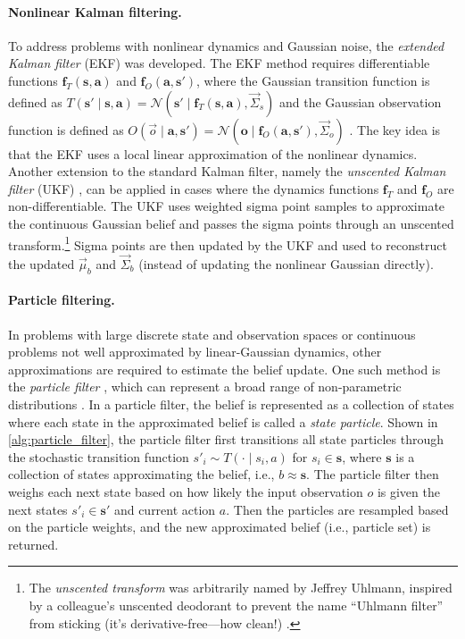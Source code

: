 

\paragraph{Nonlinear Kalman filtering.}
To address problems with nonlinear dynamics and Gaussian noise, the \textit{extended Kalman filter} (EKF) \cite{julier1997new} was developed. The EKF method requires differentiable functions $\mathbf{f}_T(\mathbf{s}, \mathbf{a})$ and $\mathbf{f}_O(\mathbf{a}, \mathbf{s}')$, where the Gaussian transition function is defined as $T(\mathbf{s}' \mid \mathbf{s}, \mathbf{a}) = \mathcal{N}(\mathbf{s}' \mid \mathbf{f}_T(\mathbf{s}, \mathbf{a}), \vec{\Sigma}_s)$ and the Gaussian observation function is defined as $O(\vec{o} \mid \mathbf{a}, \mathbf{s}') = \mathcal{N}(\mathbf{o} \mid \mathbf{f}_O(\mathbf{a}, \mathbf{s}'), \vec{\Sigma}_o)$ \cite{dmbook}.
The key idea is that the EKF uses a local linear approximation of the nonlinear dynamics.
Another extension to the standard Kalman filter, namely the \textit{unscented Kalman filter} (UKF) \cite{wan2000unscented}, can be applied in cases where the dynamics functions $\mathbf{f}_T$ and $\mathbf{f}_O$ are non-differentiable.
The UKF uses weighted sigma point samples to approximate the continuous Gaussian belief and passes the sigma points through an unscented transform.\footnote{The \textit{unscented transform} was arbitrarily named by Jeffrey Uhlmann, inspired by a colleague's unscented deodorant to prevent the name ``Uhlmann filter'' from sticking (it's derivative-free---how clean!) \cite{unscented2021uhlmann}.}
Sigma points are then updated by the UKF and used to reconstruct the updated $\vec{\mu}_b$ and $\vec{\Sigma}_b$ (instead of updating the nonlinear Gaussian directly).

\paragraph{Particle filtering.}
In problems with large discrete state and observation spaces or continuous problems not well approximated by linear-Gaussian dynamics, other approximations are required to estimate the belief update.
One such method is the \textit{particle filter} \cite{gordon1993novel}, which can represent a broad range of non-parametric distributions \cite{thrun2005probabilistic}.
In a particle filter, the belief is represented as a collection of states where each state in the approximated belief is called a \textit{state particle}.
Shown in \cref{alg:particle_filter}, the particle filter first transitions all state particles through the stochastic transition function $s'_i \sim T(\cdot \mid s_i, a)$ for $s_i \in \mathbf{s}$, where $\mathbf{s}$ is a collection of states approximating the belief, i.e., $b \approx \mathbf{s}$.
The particle filter then weighs each next state based on how likely the input observation $o$ is given the next states $s'_i \in \mathbf{s}'$ and current action $a$.
Then the particles are resampled based on the particle weights, and the new approximated belief (i.e., particle set) is returned.

